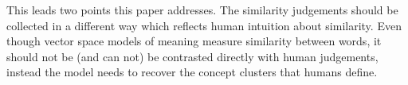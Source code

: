 \documentclass[11pt]{article}
\begin{document}
This leads two points this paper addresses. The similarity judgements should be collected in a different way which reflects human intuition about similarity. Even though vector space models of meaning measure similarity between words, it should not be (and can not) be contrasted directly with human judgements, instead the model needs to recover the concept clusters that humans define.

% 


\balance
\end{document}
